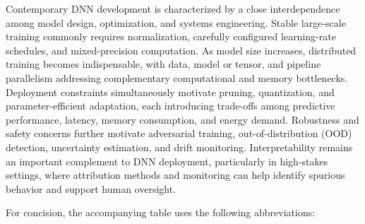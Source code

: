 \documentclass{article}
\begin{document}
Contemporary DNN development is characterized by a close interdependence among model design, optimization, and systems engineering. Stable large-scale training commonly requires normalization, carefully configured learning-rate schedules, and mixed-precision computation. As model size increases, distributed training becomes indispensable, with data, model or tensor, and pipeline parallelism addressing complementary computational and memory bottlenecks. Deployment constraints simultaneously motivate pruning, quantization, and parameter-efficient adaptation, each introducing trade-offs among predictive performance, latency, memory consumption, and energy demand. Robustness and safety concerns further motivate adversarial training, out-of-distribution (OOD) detection, uncertainty estimation, and drift monitoring. Interpretability remains an important complement to DNN deployment, particularly in high-stakes settings, where attribution methods and monitoring can help identify spurious behavior and support human oversight.

For concision, the accompanying table uses the following abbreviations:
\end{document}
